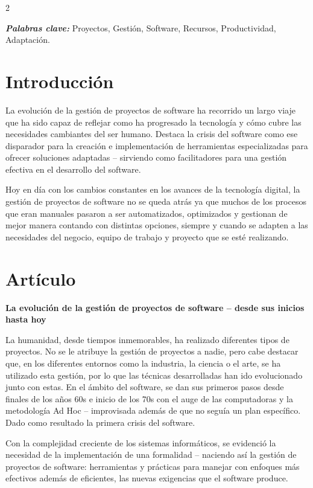 \documentclass[12pt,spanish,Letterpaper,openany]{book}
\begin{document}
\begin {multicols}{2}

\textbf{\emph{Palabras clave:}} Proyectos, Gestión, Software, Recursos, Productividad, Adaptación.

\hypertarget{introducciuxf3n-7}{%
\section{Introducción}\label{introducciuxf3n-7}}

La evolución de la gestión de proyectos de software ha recorrido un largo viaje que ha sido capaz de reflejar como ha progresado la tecnología y cómo cubre las necesidades cambiantes del ser humano. Destaca la crisis del software como ese disparador para la creación e implementación de herramientas especializadas para ofrecer soluciones adaptadas -- sirviendo como facilitadores para una gestión efectiva en el desarrollo del software.

Hoy en día con los cambios constantes en los avances de la tecnología digital, la gestión de proyectos de software no se queda atrás ya que muchos de los procesos que eran manuales pasaron a ser automatizados, optimizados y gestionan de mejor manera contando con distintas opciones, siempre y cuando se adapten a las necesidades del negocio, equipo de
trabajo y proyecto que se esté realizando.

\hypertarget{artuxedculo-7}{%
\section{Artículo}\label{artuxedculo-7}}

\textbf{La evolución de la gestión de proyectos de software -- desde sus inicios hasta hoy}

La humanidad, desde tiempos inmemorables, ha realizado diferentes tipos de proyectos. No se le atribuye la gestión de proyectos a nadie, pero cabe destacar que, en los diferentes entornos como la industria, la ciencia o el arte, se ha utilizado esta gestión, por lo que las técnicas desarrolladas han ido evolucionado junto con estas. En el ámbito del software, se dan sus primeros pasos desde finales de los años 60s e inicio de los 70s con el auge de las computadoras y la metodología Ad Hoc -- improvisada además de que no seguía un plan específico. Dado como resultado la primera crisis del software.

Con la complejidad creciente de los sistemas informáticos, se evidenció la necesidad de la implementación de una formalidad -- naciendo así la gestión de proyectos de software: herramientas y prácticas para manejar con enfoques más efectivos además de eficientes, las nuevas exigencias que el software produce.


\end{multicols}
\end{document}
